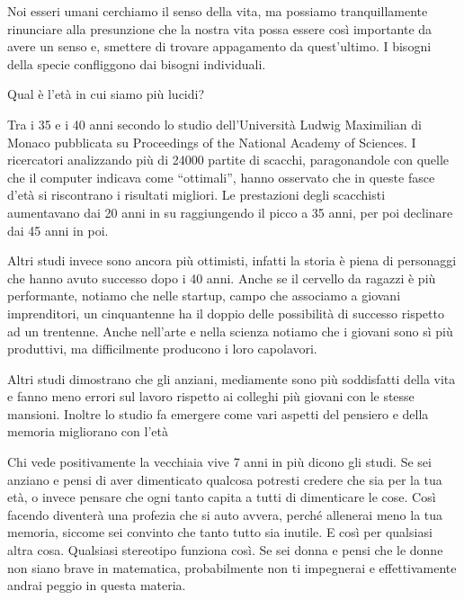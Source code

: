 \documentclass[12pt]{book} %
\begin{document}
Noi esseri umani cerchiamo il senso della vita, ma possiamo tranquillamente rinunciare alla presunzione che la nostra
vita possa essere così importante da avere un senso e, smettere di trovare appagamento da
quest'ultimo. I bisogni della specie confliggono dai bisogni individuali.


\bigskip

\begin{mdframed}[linewidth=1pt]
Qual è l'età in cui siamo più lucidi?

Tra i 35 e i 40 anni secondo lo studio dell'Università Ludwig Maximilian di Monaco pubblicata su Proceedings of the
National Academy of Sciences. I ricercatori analizzando più di 24000 partite di scacchi, paragonandole con quelle che
il computer indicava come “ottimali”, hanno osservato che in queste fasce d'età si riscontrano i
risultati migliori. Le prestazioni degli scacchisti aumentavano dai 20 anni in su raggiungendo il picco a 35 anni, per
poi declinare dai 45 anni in poi. 

Altri studi invece sono ancora più ottimisti, infatti la storia è piena di personaggi che hanno avuto successo dopo i 40
anni. Anche se il cervello da ragazzi è più performante, notiamo che nelle startup, campo che associamo a giovani
imprenditori, un cinquantenne ha il doppio delle possibilità di successo rispetto ad un trentenne. Anche nell'arte e
nella scienza notiamo che i giovani sono sì più produttivi, ma difficilmente producono i loro capolavori.

Altri studi dimostrano che gli anziani, mediamente sono più soddisfatti della vita e fanno meno errori sul lavoro
rispetto ai colleghi più giovani con le stesse mansioni. Inoltre lo studio fa emergere come vari aspetti del pensiero e
della memoria migliorano con l'età


\bigskip

Chi vede positivamente la vecchiaia vive 7 anni in più dicono gli studi. Se sei anziano e pensi di aver dimenticato
qualcosa potresti credere che sia per la tua età, o invece pensare che ogni tanto capita a tutti di dimenticare le
cose. Così facendo diventerà una profezia che si auto avvera, perché allenerai meno la tua memoria, siccome sei
convinto che tanto tutto sia inutile. E così per qualsiasi altra cosa. Qualsiasi stereotipo funziona così. Se sei donna
e pensi che le donne non siano brave in matematica, probabilmente non ti impegnerai e effettivamente andrai peggio in
questa materia.



\end{mdframed}
\end{document}
